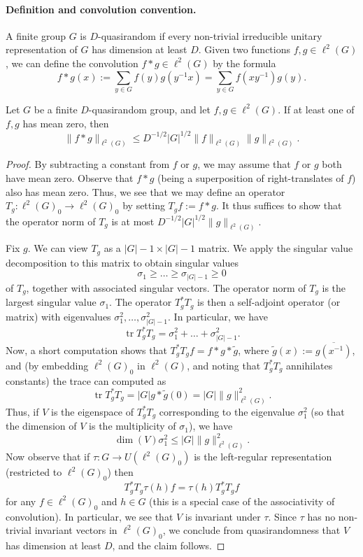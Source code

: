 
\paragraph{Definition and convolution convention.}
A finite group $G$ is $D$-quasirandom if every non-trivial irreducible unitary representation of $G$ has dimension at least $D$. Given two functions $f,g\in\ell^2(G)$, we can define the convolution $f*g\in\ell^2(G)$ by the formula
\[f*g(x):=\sum_{y\in G}f(y)g(y^{-1}x)=\sum_{y\in G}f(xy^{-1})g(y).\]
\begin{proposition}
Let $G$ be a finite $D$-quasirandom group, and let $f,g\in\ell^2(G)$. If at least one of $f,g$ has mean zero, then
\[\|f*g\|_{\ell^2(G)}\le D^{-1/2}|G|^{1/2}\|f\|_{\ell^2(G)}\|g\|_{\ell^2(G)}.\]
\end{proposition}
\begin{proof}
By subtracting a constant from $f$ or $g$, we may assume that $f$ or $g$ both have mean zero. Observe that $f*g$ (being a superposition of right-translates of $f$) also has mean zero. Thus, we see that we may define an operator $T_g:\ell^2(G)_0\to\ell^2(G)_0$ by setting $T_gf:=f*g$. It thus suffices to show that the operator norm of $T_g$ is at most $D^{-1/2}|G|^{1/2}\|g\|_{\ell^2(G)}$.

Fix $g$. We can view $T_g$ as a $|G|-1\times|G|-1$ matrix. We apply the singular value decomposition to this matrix to obtain singular values
\[\sigma_1\ge\ldots\ge\sigma_{|G|-1}\ge0\]
of $T_g$, together with associated singular vectors. The operator norm of $T_g$ is the largest singular value $\sigma_1$. The operator $T_g^*T_g$ is then a self-adjoint operator (or matrix) with eigenvalues $\sigma_1^2,\ldots,\sigma_{|G|-1}^2$. In particular, we have
\[\operatorname{tr}T_g^*T_g=\sigma_1^2+\ldots+\sigma_{|G|-1}^2.\]
Now, a short computation shows that $T_g^*T_gf=f*g*\tilde g$, where $\tilde g(x):=\overline{g(x^{-1})}$, and (by embedding $\ell^2(G)_0$ in $\ell^2(G)$, and noting that $T_g^*T_g$ annihilates constants) the trace can computed as
\[\operatorname{tr}T_g^*T_g=|G|g*\tilde g(0)=|G|\|g\|_{\ell^2(G)}^2.\]
Thus, if $V$ is the eigenspace of $T_g^*T_g$ corresponding to the eigenvalue $\sigma_1^2$ (so that the dimension of $V$ is the multiplicity of $\sigma_1$), we have
\[\dim(V)\sigma_1^2\le|G|\|g\|_{\ell^2(G)}^2.\]
Now observe that if $\tau:G\to U(\ell^2(G)_0)$ is the left-regular representation (restricted to $\ell^2(G)_0$) then
\[T_g^*T_g\tau(h)f=\tau(h)T_g^*T_gf\]
for any $f\in\ell^2(G)_0$ and $h\in G$ (this is a special case of the associativity of convolution). In particular, we see that $V$ is invariant under $\tau$. Since $\tau$ has no non-trivial invariant vectors in $\ell^2(G)_0$, we conclude from quasirandomness that $V$ has dimension at least $D$, and the claim follows.
\end{proof}

